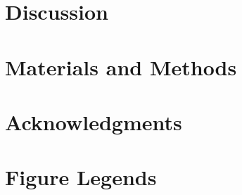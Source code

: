 \section*{Discussion}

\section*{Materials and Methods}




\section*{Acknowledgments}


%
%
% 


\section*{Figure Legends}

